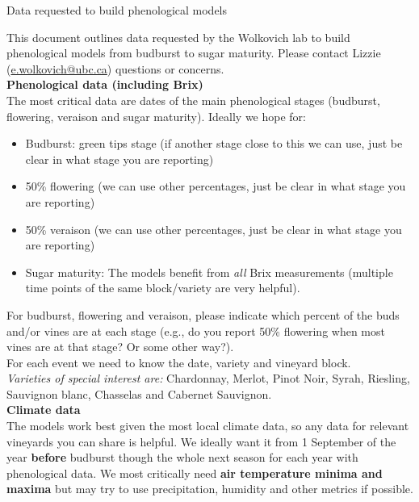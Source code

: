 \documentclass[11pt,letter]{article}
\newenvironment{smitemize}{
\begin{itemize}
  \setlength{\itemsep}{1pt}
  \setlength{\parskip}{0pt}
  \setlength{\parsep}{0pt}}
{\end{itemize}
}
\begin{document}

\renewcommand{\refname}{\CHead{}}

\begin{center}
{\Large Data requested to build phenological models}
\end{center}
This document outlines data requested by the Wolkovich lab to build phenological models from budburst to sugar maturity. Please contact Lizzie (\url{e.wolkovich@ubc.ca}) questions or concerns.\\

{\bf Phenological data (including Brix)}\\

The most critical data are dates of the main phenological stages (budburst, flowering, veraison and sugar maturity). Ideally we hope for:
\begin{smitemize}
\item Budburst: green tips stage (if another stage close to this we can use, just be clear in what stage you are reporting)
\item 50\% flowering (we can use other percentages, just be clear in what stage you are reporting)
\item 50\% veraison (we can use other percentages, just be clear in what stage you are reporting)
\item Sugar maturity: The models benefit from \emph{all} Brix measurements (multiple time points of the same block/variety are very helpful). 
\end{smitemize}
For budburst, flowering and veraison, please indicate which percent of the buds and/or vines are at each stage (e.g., do you report 50\% flowering when most vines are at that stage? Or some other way?).\\

For each event we need to know the date, variety and vineyard block.\\

\emph{Varieties of special interest are:} Chardonnay, Merlot, Pinot Noir, Syrah, Riesling, Sauvignon blanc, Chasselas and Cabernet Sauvignon.\\

{\bf Climate data}\\
The models work best given the most local climate data, so any data for relevant vineyards you can share is helpful. We ideally want it from 1 September of the year {\bf before} budburst though the whole next season for each year with phenological data. We most critically need {\bf air temperature minima and maxima} but may try to use precipitation, humidity and other metrics if possible.\\
\end{document}
